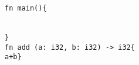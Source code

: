 \documentclass[10pt,a4paper]{article}
\begin{document}
	\begin{verbatim}
fn main(){


}
fn add (a: i32, b: i32) -> i32{
a+b}	
\end{verbatim}
	
\end{document}

